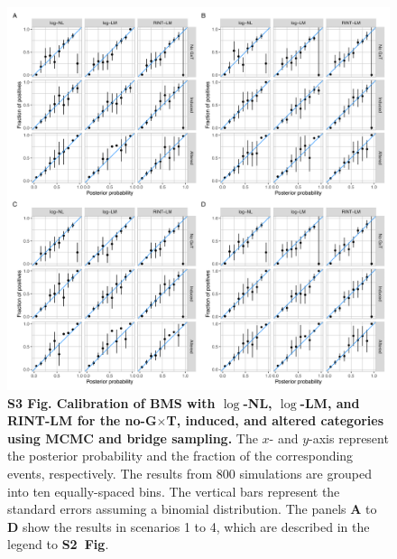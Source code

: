 \documentclass[11pt]{article}
\newcommand{\GxT}{G$\times$T\xspace}
\newcommand{\sfigroccmcmc}{\textbf{S2~Fig}\xspace}
\begin{document}
\begin{figure}[!ht]
\begin{center}
  \includegraphics[width=1\textwidth]{png/sim_calib_mcmc_bs.png}
\end{center}  
\caption{
  {\bf
    S3 Fig.
    Calibration of BMS with $\log$-NL, $\log$-LM, and RINT-LM for the no-\GxT, induced, and altered categories using MCMC and bridge sampling.} The $x$- and $y$-axis represent the posterior probability and the fraction of the corresponding events, respectively. The results from 800 simulations are grouped into ten equally-spaced bins. The vertical bars represent the standard errors assuming a binomial distribution. The panels \textbf{A} to \textbf{D} show the results in scenarios 1 to 4, which are described in the legend to \sfigroccmcmc.
}
\label{s-fig:sim-calib-mcmc}
\end{figure}
\end{document}
